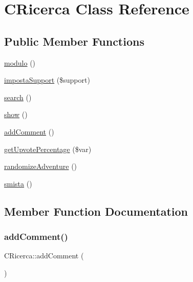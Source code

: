 \hypertarget{class_c_ricerca}{}\section{C\+Ricerca Class Reference}
\label{class_c_ricerca}
\subsection*{Public Member Functions}
\begin{DoxyCompactItemize}
\item 
\mbox{\hyperlink{class_c_ricerca_a149757b6826a18b0b3da3045cbeadd4c}{modulo}} ()
\item 
\mbox{\hyperlink{class_c_ricerca_a08fab74f09629da7944d8fb462db99f2}{imposta\+Support}} (\$support)
\item 
\mbox{\hyperlink{class_c_ricerca_ad9db48dfeb34933bf9d12c911d2b34a4}{search}} ()
\item 
\mbox{\hyperlink{class_c_ricerca_a86b16017d05539bb20445d2bcff3b16a}{show}} ()
\item 
\mbox{\hyperlink{class_c_ricerca_aedf6627cd6b696972d0e957c752918b0}{add\+Comment}} ()
\item 
\mbox{\hyperlink{class_c_ricerca_a1792ba41fe84b680ca7cee896402a83a}{get\+Upvote\+Percentage}} (\$var)
\item 
\mbox{\hyperlink{class_c_ricerca_a33fcd2d514cb41fbffcdc8bdd97c6176}{randomize\+Adventure}} ()
\item 
\mbox{\hyperlink{class_c_ricerca_ac96d19e55d037f65635a90579c76c84c}{smista}} ()
\end{DoxyCompactItemize}


\subsection{Member Function Documentation}
\mbox{\label{class_c_ricerca_aedf6627cd6b696972d0e957c752918b0}} 
\subsubsection{\texorpdfstring{add\+Comment()}{addComment()}}
{\footnotesize\ttfamily C\+Ricerca\+::add\+Comment (\begin{DoxyParamCaption}{ }\end{DoxyParamCaption})}


